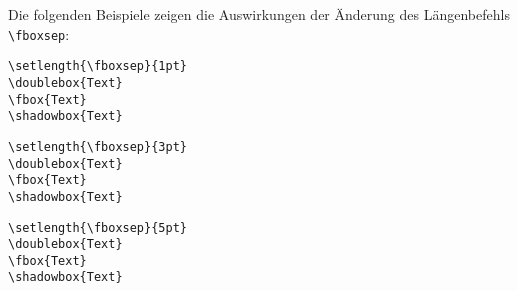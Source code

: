 Die folgenden Beispiele zeigen die Auswirkungen der Änderung des Längenbefehls \verb!\fboxsep!:

\begin{minipage}[c]{0.5\textwidth}
\setlength{\parskip}{1em}
\setlength{\fboxsep}{1pt}
\hspace{5mm}
\hspace{5mm}
\hspace{5mm}
\hfill
\end{minipage}
\hfill
\begin{minipage}[c]{0.48\textwidth}
\setlength{\parskip}{1em}
\begin{lstlisting}[label=tabularmultirow5, style=customlatex]
\setlength{\fboxsep}{1pt}
\doublebox{Text} 
\fbox{Text}
\shadowbox{Text}
\end{lstlisting}
\end{minipage}

\begin{minipage}[c]{0.5\textwidth}
\setlength{\parskip}{1em}
\setlength{\fboxsep}{3pt}
\hspace{5mm}
\hspace{5mm}
\hspace{5mm}
\hfill
\end{minipage}
\hfill
\begin{minipage}[c]{0.48\textwidth}
\setlength{\parskip}{1em}
\begin{lstlisting}[label=tabularmultirow6, style=customlatex]
\setlength{\fboxsep}{3pt}
\doublebox{Text} 
\fbox{Text}
\shadowbox{Text}
\end{lstlisting}
\end{minipage}

\begin{minipage}[c]{0.5\textwidth}
\setlength{\parskip}{1em}
\setlength{\fboxsep}{5pt}
\hspace{5mm}
\hspace{5mm}
\hspace{5mm}
\hfill
\end{minipage}
\hfill
\begin{minipage}[c]{0.48\textwidth}
\setlength{\parskip}{1em}
\begin{lstlisting}[label=tabularmultirow7, style=customlatex]
\setlength{\fboxsep}{5pt}
\doublebox{Text} 
\fbox{Text}
\shadowbox{Text}
\end{lstlisting}
\end{minipage}

